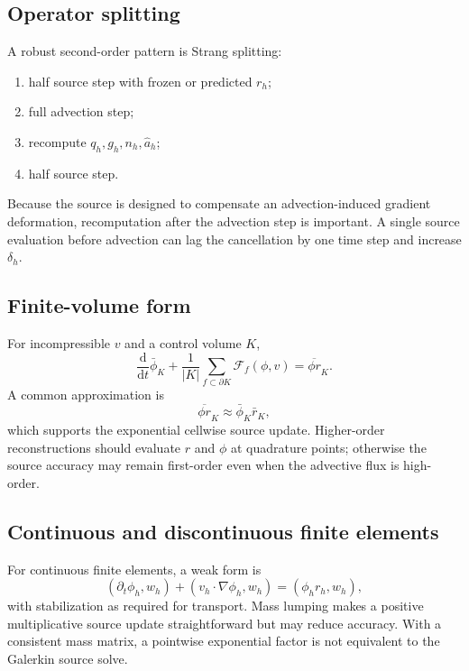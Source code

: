 \documentclass[11pt,a4paper]{article}
\theoremstyle{definition}
\theoremstyle{remark}
\begin{document}
\subsection{Operator splitting}

A robust second-order pattern is Strang splitting:
\begin{enumerate}
  \item half source step with frozen or predicted $r_h$;
  \item full advection step;
  \item recompute $q_h,g_h,n_h,\widehat a_h$;
  \item half source step.
\end{enumerate}
Because the source is designed to compensate an advection-induced gradient deformation, recomputation after the advection step is important. A single source evaluation before advection can lag the cancellation by one time step and increase $\delta_h$.

\subsection{Finite-volume form}

For incompressible $v$ and a control volume $K$,
\begin{equation}
  \frac{\mathrm d}{\mathrm dt}\bar\phi_K
  +\frac1{|K|}\sum_{f\subset\partial K}\mathcal F_f(\phi,v)
  =\overline{\phi r}_K.
\end{equation}
A common approximation is
\begin{equation}
  \overline{\phi r}_K\approx\bar\phi_K\bar r_K,
\end{equation}
which supports the exponential cellwise source update. Higher-order reconstructions should evaluate $r$ and $\phi$ at quadrature points; otherwise the source accuracy may remain first-order even when the advective flux is high-order.

\subsection{Continuous and discontinuous finite elements}

For continuous finite elements, a weak form is
\begin{equation}
  (\partial_t\phi_h,w_h)+(v_h\cdot\nabla\phi_h,w_h)
  =(\phi_h r_h,w_h),
\end{equation}
with stabilization as required for transport. Mass lumping makes a positive multiplicative source update straightforward but may reduce accuracy. With a consistent mass matrix, a pointwise exponential factor is not equivalent to the Galerkin source solve.
\end{document}

